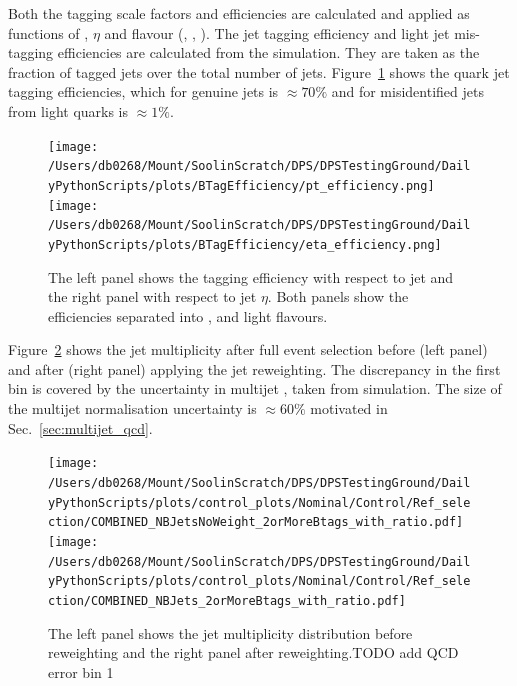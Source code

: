 Both the \bquark{} tagging scale factors and efficiencies are calculated and applied as functions of \pt{}, $\eta$ and flavour (\bquark{}, \cquark{}, \udsg{}).
The \bquark{} jet tagging efficiency and light jet mis-tagging efficiencies are calculated from the \powhegpythia \ttbar{} simulation.
They are taken as the fraction of tagged jets over the total number of \bquark{} jets.
Figure~\ref{fig:BTag} shows the \bquark{} quark jet tagging efficiencies, which for genuine \bquark{} jets is $\approx70\%$ and for misidentified jets from light quarks is $\approx1\%$.
\begin{figure}[htpb]
	\centering
	\texttt{[image: /Users/db0268/Mount/SoolinScratch/DPS/DPSTestingGround/DailyPythonScripts/plots/BTagEfficiency/pt\_efficiency.png]}
	\texttt{[image: /Users/db0268/Mount/SoolinScratch/DPS/DPSTestingGround/DailyPythonScripts/plots/BTagEfficiency/eta\_efficiency.png]}
	\caption[The left panel shows the \bquark{} tagging efficiency with respect to jet \pt{} and the right panel with respect to jet $\eta$. Both panels show the efficiencies separated into \bquark{}, \cquark{} and light flavours.]{The left panel shows the \bquark{} tagging efficiency with respect to jet \pt{} and the right panel with respect to jet $\eta$. Both panels show the efficiencies separated into \bquark{}, \cquark{} and light flavours.}
	\label{fig:BTag}
\end{figure}

Figure~\ref{fig:BWeight} shows the \bquark{} jet multiplicity after full event selection before (left panel) and after (right panel) applying the \bquark{} jet reweighting.
The discrepancy in the first bin is covered by the uncertainty in multijet \QCD{}, taken from simulation.
The size of the multijet \QCD{} normalisation uncertainty is $\approx60\%$ motivated in Sec.~\ref{sec:multijet_qcd}.
\begin{figure}[htpb]
	\centering
	\texttt{[image: /Users/db0268/Mount/SoolinScratch/DPS/DPSTestingGround/DailyPythonScripts/plots/control\_plots/Nominal/Control/Ref\_selection/COMBINED\_NBJetsNoWeight\_2orMoreBtags\_with\_ratio.pdf]}
	\texttt{[image: /Users/db0268/Mount/SoolinScratch/DPS/DPSTestingGround/DailyPythonScripts/plots/control\_plots/Nominal/Control/Ref\_selection/COMBINED\_NBJets\_2orMoreBtags\_with\_ratio.pdf]}	
	\caption[The left panel shows the \bquark{} jet multiplicity distribution before reweighting and the right panel after reweighting.]{The left panel shows the \bquark{} jet multiplicity distribution before reweighting and the right panel after reweighting.TODO add QCD error bin 1}
	\label{fig:BWeight}
\end{figure}

